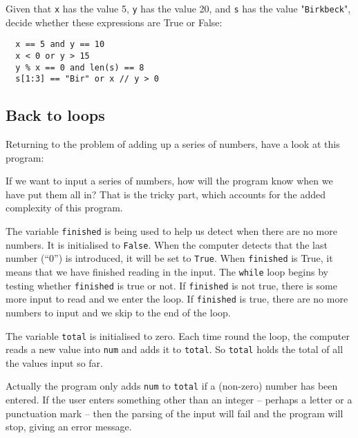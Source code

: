 Given that \texttt{x} has the value 5, \texttt{y} has the value 20,
and \texttt{s} has the value "\texttt{Birkbeck}", decide whether these
expressions are True or False:

\begin{verbatim}
  x == 5 and y == 10
  x < 0 or y > 15
  y % x == 0 and len(s) == 8
  s[1:3] == "Bir" or x // y > 0
\end{verbatim}


\subsection{Back to loops}
\label{subsec:backtoloops}

Returning to the problem of adding up a series of numbers, have a
look at this program:


If we want to input a series of numbers, how will the program know
when we have put them all in?  That is the tricky part, which accounts
for the added complexity of this program.

The variable
\texttt{finished} is being used to help us detect when there are no more
numbers. It is initialised to \texttt{False}.  When the computer detects
that the last number (``0'') is introduced, it will be set to \texttt{True}.
When \texttt{finished} is True, it means that we have finished reading in
the input. The \texttt{while} loop begins by testing whether \texttt{finished}
is true or not.  If \texttt{finished} is not true, there is some more input
to read and we enter the loop. If \texttt{finished} is true, there are
no more numbers to input and we skip to the end of the loop.

The variable \texttt{total} is initialised to zero.
Each time round the loop, the computer reads a new value into \texttt{num}
and adds it to \texttt{total}. So \texttt{total} holds the total of all
the values input so far.

Actually the program only adds  \texttt{num} to \texttt{total} if a (non-zero) 
number has been entered. 
If the user enters something other than an integer 
-- perhaps a letter or a punctuation mark -- 
then the parsing of the input will fail 
and the program will stop, giving an error message.

